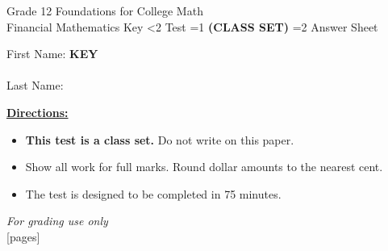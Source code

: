 \documentclass[addpoints]{exam}
\newcommand{\event}{Financial Mathematics}
\newcommand{\tournament}{}
\def\type{0}
\begin{document}
\begin{center}
    {\huge Grade 12 Foundations for College Math \\ \event
    \ifprintanswers \space Key
    \else \space \ifnum\type<2 Test \fi \ifnum\type=1 \textbf{(CLASS SET)} \fi
          \ifnum\type=2 Answer Sheet \fi
    \fi \\ \vspace{3mm}\tournament\vspace{1mm}}
\end{center}

\vspace{.25\textheight}

\begin{center}
    First Name: \ifprintanswers
    \underline{\hspace{3.5cm}}\textbf{KEY}\underline{\hspace{5.5cm}}\\\ \vspace{5mm}
    \else \underline{\hspace{10cm}}\\ \vspace{5mm} \fi
    Last Name: \underline{\hspace{10cm}}\\ \vspace{5mm}
\end{center}

\noindent\textbf{\underline{Directions:}}
\begin{itemize}
    \ifnum\type=1 \item \textbf{This test is a class set.} Do not write on this paper. \fi
    \item Show all work for full marks. Round dollar amounts to the nearest cent.
    \item The test is designed to be completed in 75 minutes.
\end{itemize}
\begin{center}
\textit{For grading use only}\\
[pages]
\end{center}
\end{document}
